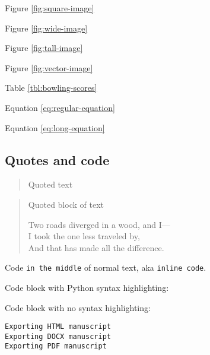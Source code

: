 Figure \ref{fig:square-image}

Figure \ref{fig:wide-image}

Figure \ref{fig:tall-image}

Figure \ref{fig:vector-image}

Table \ref{tbl:bowling-scores}

Equation \ref{eq:regular-equation}

Equation \ref{eq:long-equation}

\hypertarget{quotes-and-code}{%
\subsection{Quotes and code}\label{quotes-and-code}}

\begin{quote}
Quoted text
\end{quote}

\begin{quote}
Quoted block of text

Two roads diverged in a wood, and I---\\
I took the one less traveled by,\\
And that has made all the difference.
\end{quote}

Code \texttt{in\ the\ middle} of normal text, aka \texttt{inline\ code}.

Code block with Python syntax highlighting:

\begin{Shaded}
\begin{Highlighting}[]

\OperatorTok{=}\NormalTok{)}
    \OperatorTok{==} 
\end{Highlighting}
\end{Shaded}

Code block with no syntax highlighting:

\begin{verbatim}
Exporting HTML manuscript
Exporting DOCX manuscript
Exporting PDF manuscript
\end{verbatim}

